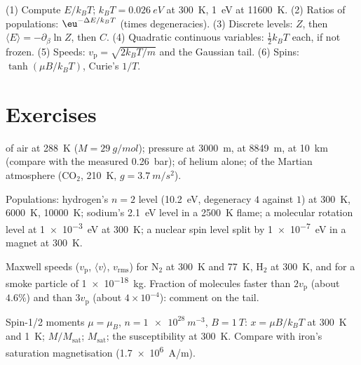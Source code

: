 \begin{method}\label{meth:b2:boltzmann-factor:method}
(1) Compute $E/k_BT$; $k_BT = \qty{0.026}{eV}$ at \qty{300}{K}, \qty{1}{eV}
at \qty{11600}{K}. (2) Ratios of populations: $\eu^{-\Delta E/k_BT}$ (times
degeneracies). (3) Discrete levels: $Z$, then $\langle E\rangle =
-\partial_\beta\ln Z$, then $C$. (4) Quadratic continuous variables:
$\tfrac12k_BT$ each, if not frozen. (5) Speeds: $v_{\text{p}} = \sqrt{2k_BT/m}$
and the Gaussian tail. (6) Spins: $\tanh(\mu B/k_BT)$, Curie's $1/T$.
\end{method}

\section{Exercises}

\begin{exercise}[$\star$]\label{exo:b2:boltzmann-factor:1}
 of air at \qty{288}{K} ($M = \qty{29}{g/mol}$); pressure at
\qty{3000}{m}, at \qty{8849}{m}, at \qty{10}{km} (compare with the measured
\qty{0.26}{bar});  of helium alone; of the Martian atmosphere
(CO$_2$, \qty{210}{K}, $g = \qty{3.7}{m/s^2}$).
\end{exercise}

\begin{exercise}[$\star$]\label{exo:b2:boltzmann-factor:2}
Populations: hydrogen's $n = 2$ level (\qty{10.2}{eV}, degeneracy $4$
against $1$) at \qty{300}{K}, \qty{6000}{K}, \qty{10000}{K}; sodium's
\qty{2.1}{eV} level in a \qty{2500}{K} flame; a molecular rotation level at
\qty{1e-3}{eV} at \qty{300}{K}; a nuclear spin level split by \qty{1e-7}{eV} in
a magnet at \qty{300}{K}.
\end{exercise}

\begin{exercise}[$\star$]\label{exo:b2:boltzmann-factor:3}
Maxwell speeds ($v_{\text{p}}$, $\langle v\rangle$, $v_{\text{rms}}$) for N$_2$
at \qty{300}{K} and \qty{77}{K}, H$_2$ at \qty{300}{K}, and for a smoke
particle of \qty{1e-18}{kg}. Fraction of molecules faster than $2v_{\text{p}}$
(about $4.6\%$) and than $3v_{\text{p}}$ (about $4 \times 10^{-4}$): comment on
the tail.
\end{exercise}

\begin{exercise}[$\star$]\label{exo:b2:boltzmann-factor:4}
Spin-1/2 moments $\mu = \mu_B$, $n = \qty{1e28}{m^{-3}}$, $B = \qty{1}{T}$:
$x = \mu B/k_BT$ at \qty{300}{K} and \qty{1}{K}; $M/M_{\text{sat}}$; $M_{\text{sat}}$;
the susceptibility at \qty{300}{K}. Compare with iron's saturation
magnetisation (\qty{1.7e6}{A/m}).
\end{exercise}

